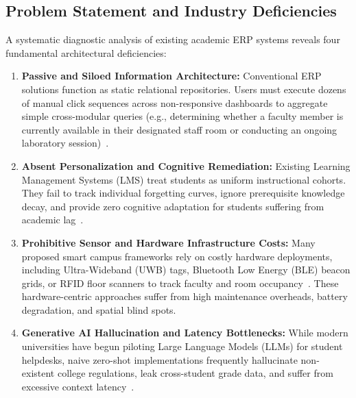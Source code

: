 \documentclass[11pt,a4paper]{article}
\begin{document}
\subsection{Problem Statement and Industry Deficiencies}
A systematic diagnostic analysis of existing academic ERP systems reveals four fundamental architectural deficiencies:
\begin{enumerate}[label=\textbf{(\alph*)}]
    \item \textbf{Passive and Siloed Information Architecture:} Conventional ERP solutions function as static relational repositories. Users must execute dozens of manual click sequences across non-responsive dashboards to aggregate simple cross-modular queries (e.g., determining whether a faculty member is currently available in their designated staff room or conducting an ongoing laboratory session)~\cite{patel2025decoupled}.
    \item \textbf{Absent Personalization and Cognitive Remediation:} Existing Learning Management Systems (LMS) treat students as uniform instructional cohorts. They fail to track individual forgetting curves, ignore prerequisite knowledge decay, and provide zero cognitive adaptation for students suffering from academic lag~\cite{wang2024adaptive}.
    \item \textbf{Prohibitive Sensor and Hardware Infrastructure Costs:} Many proposed smart campus frameworks rely on costly hardware deployments, including Ultra-Wideband (UWB) tags, Bluetooth Low Energy (BLE) beacon grids, or RFID floor scanners to track faculty and room occupancy~\cite{rao2024real}. These hardware-centric approaches suffer from high maintenance overheads, battery degradation, and spatial blind spots.
    \item \textbf{Generative AI Hallucination and Latency Bottlenecks:} While modern universities have begun piloting Large Language Models (LLMs) for student helpdesks, naive zero-shot implementations frequently hallucinate non-existent college regulations, leak cross-student grade data, and suffer from excessive context latency~\cite{liu2024lost, lewis2020retrieval}.
\end{enumerate}
\end{document}
